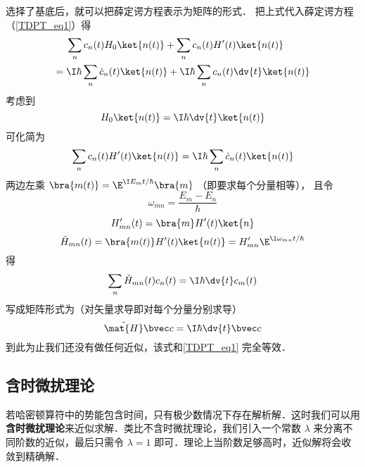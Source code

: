 选择了基底后，就可以把薛定谔方程表示为矩阵的形式． %
把上式代入薛定谔方程（\autoref{TDPT_eq1}）得
\begin{equation}
\begin{aligned}
&\sum_n c_n(t) H_0 \ket{n(t)} + \sum_n c_n(t) H'(t) \ket{n(t)} \\ 
={} &\I\hbar \sum_n \dot c_n(t) \ket{n(t)}
+ \I\hbar \sum_n c_n(t) \dv{t} \ket{n(t)}
\end{aligned}
\end{equation}
考虑到
\begin{equation}
H_0\ket{n(t)} = \I\hbar \dv{t} \ket{n(t)}
\end{equation}
可化简为
\begin{equation}\label{TDPT_eq11}
\sum_n c_n(t) H'(t) \ket{n(t)}
= \I\hbar \sum_n \dot c_n(t) \ket{n(t)}
\end{equation}
两边左乘 $\bra{m(t)} = \E^{\I E_m t/\hbar}\bra{m}$ （即要求每个分量相等）， 且令
\begin{equation}
\omega_{mn} = \frac{E_m-E_n}{\hbar}
\end{equation}
\begin{equation}
H'_{mn}(t) = \bra{m} H'(t)\ket{n}
\end{equation}
\begin{equation}\label{TDPT_eq7}
\tilde H_{mn}(t) = \bra{m(t)} H'(t) \ket{n(t)} = H'_{mn} \E^{\I\omega_{mn}t/\hbar}
\end{equation}
得
\begin{equation}\label{TDPT_eq2}
\sum_n \tilde H_{mn}(t) c_n(t)
= \I\hbar \dv{t} c_m(t)
\end{equation}
写成矩阵形式为（对矢量求导即对每个分量分别求导）
\begin{equation}\label{TDPT_eq3}
\tilde{\mat {H}} \bvec c = \I\hbar \dv{t} \bvec c
\end{equation}
到此为止我们还没有做任何近似，该式和\autoref{TDPT_eq1} 完全等效．

\subsection{含时微扰理论}
若哈密顿算符中的势能包含时间，只有极少数情况下存在解析解．这时我们可以用\textbf{含时微扰理论}来近似求解．类比不含时微扰理论，我们引入一个常数 $\lambda$ 来分离不同阶数的近似，最后只需令 $\lambda = 1$ 即可．理论上当阶数足够高时，近似解将会收敛到精确解．%

